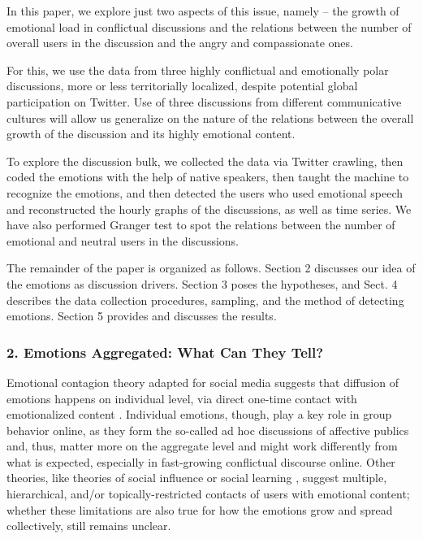 In this paper, we explore just two aspects of this issue, namely -- the growth of emotional load in conflictual discussions and the relations between the number of overall users in the discussion and the angry and compassionate ones.

For this, we use the data from three highly conflictual and emotionally polar discussions, more or less territorially localized, despite potential global participation on Twitter. Use of three discussions from different communicative cultures will allow us generalize on the nature of the relations between the overall growth of the discussion and its highly emotional content.

To explore the discussion bulk, we collected the data via Twitter crawling, then coded the emotions with the help of native speakers, then taught the machine to recognize the emotions, and then detected the users who used emotional speech and reconstructed the hourly graphs of the discussions, as well as time series. We have also performed Granger test to spot the relations between the number of emotional and neutral users in the discussions.

The remainder of the paper is organized as follows. Section 2 discusses our idea of the emotions as discussion drivers. Section 3 poses the hypotheses, and Sect. 4 describes the data collection procedures, sampling, and the method of detecting emotions. Section 5 provides and discusses the results.

\subsubsection{2. Emotions Aggregated: What Can They Tell?}

Emotional contagion theory \cite{HatfieldBensmanThornton} adapted for social media suggests that diffusion of emotions happens on individual level, via direct one-time contact with emotionalized content \cite{CovielloSohnKramer}. Individual emotions, though, play a key role in group behavior online, as they form the so-called ad hoc discussions \cite{BrunsBurgess} of affective publics \cite{Papacharissi} and, thus, matter more on the aggregate level and might work differently from what is expected, especially in fast-growing conflictual discourse online. Other theories, like theories of social influence or social learning \cite{Young}, suggest multiple, hierarchical, and/or topically-restricted contacts of users with emotional content; whether these limitations are also true for how the emotions grow and spread collectively, still remains unclear.

